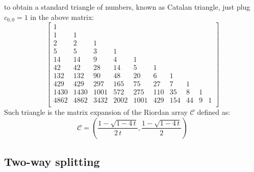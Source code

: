 to obtain a standard triangle of numbers, known as Catalan triangle, just plug $c_{0,0}=1$
in the above matrix:
\begin{equation}
\left[\begin{matrix}
1 &  &  &  &  &  &  &  &  &  \\
1 & 1 &  &  &  &  &  &  &  &  \\
2 & 2 & 1 &  &  &  &  &  &  &  \\
5 & 5 & 3 & 1 &  &  &  &  &  &  \\
14 & 14 & 9 & 4 & 1 &  &  &  &  &  \\
42 & 42 & 28 & 14 & 5 & 1 &  &  &  &  \\
132 & 132 & 90 & 48 & 20 & 6 & 1 &  &  &  \\
429 & 429 & 297 & 165 & 75 & 27 & 7 & 1 &  &  \\
1430 & 1430 & 1001 & 572 & 275 & 110 & 35 & 8 & 1 &  \\
4862 & 4862 & 3432 & 2002 & 1001 & 429 & 154 & 44 & 9 & 1 \\
\end{matrix}\right]
\label{eq:standard:catalan}
\end{equation}
Such triangle is the matrix expansion of the Riordan array $\mathcal{C}$ defined as:
\begin{displaymath}
    \mathcal{C}=\left(\frac{1-\sqrt{1-4\,t}}{2\,t},
        \frac{1-\sqrt{1-4\,t}}{2}\right)
\end{displaymath}

\subsection{Two-way splitting}

